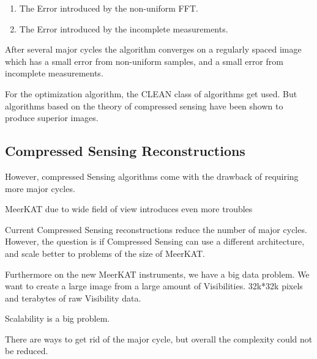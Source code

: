 \begin{enumerate}
	\item The Error introduced by the non-uniform FFT.
	\item The Error introduced by the incomplete measurements.
\end{enumerate}

After several major cycles the algorithm converges on a regularly spaced image which has a small error from non-uniform samples, and a small error from incomplete measurements.

For the optimization algorithm, the CLEAN class of algorithms get used. But algorithms based on the theory of compressed sensing have been shown to produce superior images.


\subsection{Compressed Sensing Reconstructions}
 However, compressed Sensing algorithms come with the drawback of requiring more major cycles.

MeerKAT due to wide field of view introduces even more troubles

Current Compressed Sensing reconstructions reduce the number of major cycles. However, the question is if Compressed Sensing can use a different architecture, and scale better to problems of the size of MeerKAT.

Furthermore on the new MeerKAT instruments, we have a big data problem. We want to create a large image from a large amount of Visibilities. 32k*32k pixels and terabytes of raw Visibility data. 

Scalability is a big problem.

There are ways to get rid of the major cycle, but overall the complexity could not be reduced.









